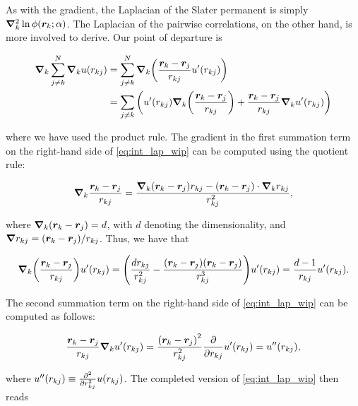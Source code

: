 As with the gradient, the Laplacian of the Slater permanent is simply $\grad_k^2 \ln \phi \qty(\bm{r}_k; \alpha)$. The Laplacian of the pairwise correlations, on the other hand, is more involved to derive. Our point of departure is 

\begin{equation}\label{eq:int_lap_wip}
\begin{aligned}
    \grad_k \sum_{j\neq k}^N \grad_k u \qty(r_{kj}) &= \sum_{j \neq k}^N \grad_k  \qty( \frac{\bm{r}_k - \bm{r}_j }{r_{kj}} u' \qty(r_{kj}))
    \\
    &= \sum_{j \neq k} \qty(u' \qty(r_{kj})\grad_k  \qty( \frac{\bm{r}_k - \bm{r}_j }{r_{kj}}) + \frac{\bm{r}_k - \bm{r}_j }{r_{kj}} \grad_k u' \qty(r_{kj}))
\end{aligned}
\end{equation}

where we have used the product rule. The gradient in the first summation term on the right-hand side of \autoref{eq:int_lap_wip} can be computed using the quotient rule: 

\begin{equation*}
    \grad_k \frac{\bm{r}_k - \bm{r}_j }{r_{kj}} = \frac{\grad_k \qty(\bm{r}_k - \bm{r}_j) r_{kj} - \qty(\bm{r}_k - \bm{r}_j) \cdot \grad_k r_{kj} }{ r_{kj}^2 }, 
\end{equation*}

where $\grad_k \qty(\bm{r}_k - \bm{r}_j) = d$, with $d$ denoting the dimensionality, and $\grad r_{kj} = \qty(\bm{r}_k - \bm{r}_j) / r_{kj}$. Thus, we have that 

\begin{equation*}
    \grad_k \qty(\frac{\bm{r}_k - \bm{r}_j }{r_{kj}}) u' \qty(r_{kj}) = \qty(\frac{d r_{kj}}{r_{kj}^2} - \frac{\qty(\bm{r}_k - \bm{r}_j)\qty(\bm{r}_k - \bm{r}_j)}{r_{kj}^3}) u' \qty(r_{kj}) = \frac{d - 1}{r_{kj}} u' \qty(r_{kj}).
\end{equation*}

The second summation term on the right-hand side of \autoref{eq:int_lap_wip} can be computed as follows: 

\begin{equation*}
    \frac{\bm{r}_k - \bm{r}_j }{r_{kj}} \grad_k u' \qty(r_{kj}) = \frac{\qty(\bm{r}_k - \bm{r}_j)^2}{r_{kj}^2} \pdv{r_{kj}}  u' \qty(r_{kj}) =  u'' \qty(r_{kj}), 
\end{equation*}

where $ u'' \qty(r_{kj}) \equiv \pdv[2]{r_{kj}}  u \qty(r_{kj})$. The completed version of \autoref{eq:int_lap_wip} then reads

